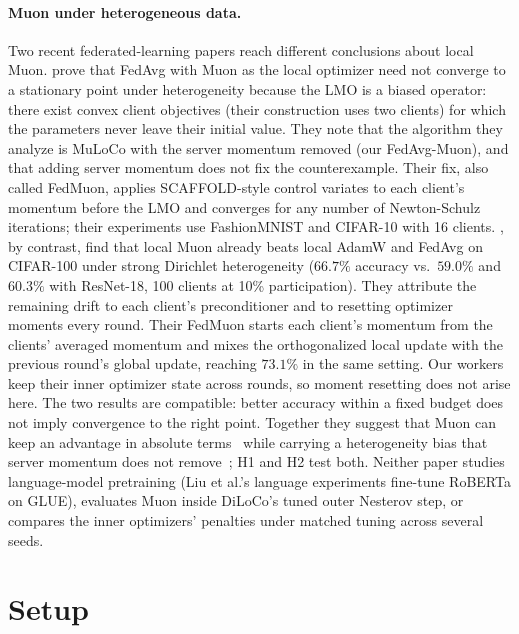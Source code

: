 \documentclass{article}
\begin{document}
\paragraph{Muon under heterogeneous data.} Two recent federated-learning papers reach different conclusions about local Muon. \citet{takezawa2026fedmuon} prove that FedAvg with Muon as the local optimizer need not converge to a stationary point under heterogeneity because the LMO is a biased operator: there exist convex client objectives (their construction uses two clients) for which the parameters never leave their initial value. They note that the algorithm they analyze is MuLoCo with the server momentum removed (our FedAvg-Muon), and that adding server momentum does not fix the counterexample. Their fix, also called FedMuon, applies SCAFFOLD-style control variates to each client's momentum before the LMO and converges for any number of Newton-Schulz iterations; their experiments use FashionMNIST and CIFAR-10 with 16 clients. \citet{liu2025fedmuon}, by contrast, find that local Muon already beats local AdamW and FedAvg on CIFAR-100 under strong Dirichlet heterogeneity ($66.7\%$ accuracy vs.\ $59.0\%$ and $60.3\%$ with ResNet-18, 100 clients at 10\% participation). They attribute the remaining drift to each client's preconditioner and to resetting optimizer moments every round. Their FedMuon starts each client's momentum from the clients' averaged momentum and mixes the orthogonalized local update with the previous round's global update, reaching $73.1\%$ in the same setting. Our workers keep their inner optimizer state across rounds, so moment resetting does not arise here. The two results are compatible: better accuracy within a fixed budget does not imply convergence to the right point. Together they suggest that Muon can keep an advantage in absolute terms~\cite{liu2025fedmuon} while carrying a heterogeneity bias that server momentum does not remove~\cite{takezawa2026fedmuon}; H1 and H2 test both. Neither paper studies language-model pretraining (Liu et al.'s language experiments fine-tune RoBERTa on GLUE), evaluates Muon inside DiLoCo's tuned outer Nesterov step, or compares the inner optimizers' penalties under matched tuning across several seeds.

\section{Setup}\label{sec:setup}
\end{document}
